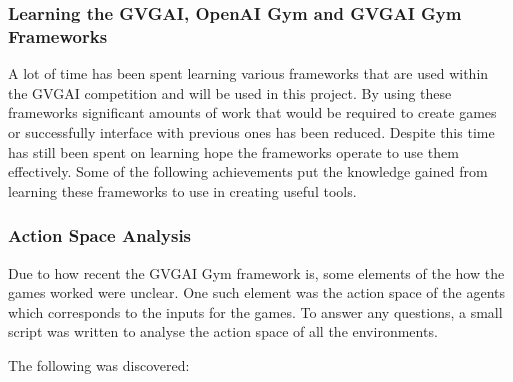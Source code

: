 \documentclass[a4paper]{article}
\begin{document}
\subsubsection{Learning the GVGAI, OpenAI Gym and GVGAI Gym Frameworks}
A lot of time has been spent learning various frameworks that are used within the GVGAI competition and will be used in this project.
By using these frameworks significant amounts of work that would be required to create games or successfully interface with previous ones has been reduced.
Despite this time has still been spent on learning hope the frameworks operate to use them effectively.
Some of the following achievements put the knowledge gained from learning these frameworks to use in creating useful tools.

\subsubsection{Action Space Analysis}
Due to how recent the GVGAI Gym framework is, some elements of the how the games worked were unclear.
One such element was the action space of the agents which corresponds to the inputs for the games.
To answer any questions, a small script was written to analyse the action space of all the environments.
\par
The following was discovered:
\end{document}
